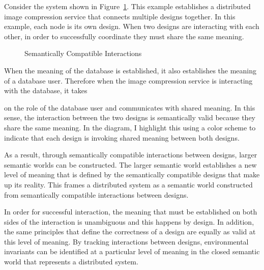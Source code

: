 

Consider the system shown in Figure~\ref{fig:semantically_compatible_interactions}. This example establishes a distributed image compression service that connects multiple designs together. In this example, each node is its own design. When two designs are interacting with each other, in order to successfully coordinate they must share the same meaning.

\begin{figure}[htbp]
    
    \caption{Semantically Compatible Interactions}
    \label{fig:semantically_compatible_interactions}
\end{figure}

When the meaning of the database is established, it also establishes the meaning of a database user. Therefore when the image compression service is interacting with the database, it takes

on the role of the database user and communicates with shared meaning. In this sense, the interaction between the two designs is semantically valid because they share the same meaning. In the diagram, I highlight this using a color scheme to indicate that each design is invoking shared meaning between both designs.

As a result, through semantically compatible interactions between designs, larger semantic worlds can be constructed. The larger semantic world establishes a new level of meaning that is defined by the semantically compatible designs that make up its reality. This frames a distributed system as a semantic world constructed from semantically compatible interactions between designs.

In order for successful interaction, the meaning that must be established on both sides of the interaction is unambiguous and this happens by design. In addition, the same principles that define the correctness of a design are equally as valid at this level of meaning. By tracking interactions between designs, environmental invariants can be identified at a particular level of meaning in the closed semantic world that represents a distributed system.
